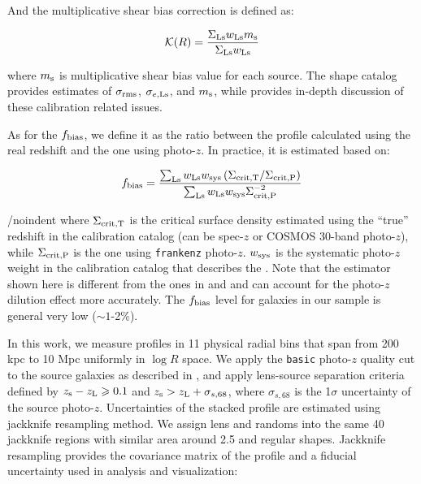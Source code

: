 \documentclass[fleqn,usenatbib,useAMS,english]{mnras}
\begin{document}
    \noindent And the multiplicative shear bias correction is defined as:

    \begin{equation}
        \mathcal{K}(R) = \frac{\Sigma_{\rm Ls} w_{\rm Ls} m_{\rm s}}{\Sigma_{\rm Ls} w_{\rm Ls}}
        \label{eq:kfactor}
    \end{equation}

    \noindent where $m_{\rm s}$ is multiplicative shear bias value for each source.
    The shape catalog provides estimates of $\sigma_{\rm rms}$, $\sigma_{e, \rm Ls}$, and $m_{\rm s}$,
    while \citet{HSC-WLCALIB} provides in-depth discussion of these calibration related
    issues.

    As for the $f_{\rm bias}$, we define it as the ratio between the \dsigma{} profile calculated using
    the real redshift and the one using photo-$z$.
    In practice, it is estimated based on:

    \begin{equation}
        f_{\rm bias} = \frac{\sum_{\rm Ls} w_{\rm Ls} w_{\rm sys}
            \left(\Sigma_{{\rm crit, T}} / \Sigma_{{\rm crit, P}} \right)}{
            \sum_{\rm Ls} w_{\rm Ls} w_{\rm sys} \Sigma^{-2}_{\rm crit, P}}
        \label{eq:fbias}
    \end{equation}

    /noindent where $\Sigma_{{\rm crit, T}}$ is the critical surface density estimated using the
    ``true'' redshift in the calibration catalog (can be spec-$z$ or COSMOS 30-band photo-$z$),
    while $\Sigma_{{\rm crit, P}}$ is the one using \texttt{frankenz} photo-$z$.
    $w_{\rm sys}$ is the systematic photo-$z$ weight in the calibration catalog that describes
    the .
    Note that the estimator shown here is different from the ones in \citet{Leauthaud2017} and
    \citet{Speagle2019} and can account for the photo-$z$ dilution effect more accurately.
    The $f_{\rm bias}$ level for galaxies in our sample is general very low ($\sim 1$-2\%).

    In this work, we measure \dsigma{} profiles in 11 physical radial bins that span from 200 kpc
    to 10 Mpc uniformly in $\log R$ space.
    We apply the \texttt{basic} photo-$z$ quality cut to the source galaxies as described in
    \citet{Speagle2019}, and apply lens-source separation criteria defined by
    $z_{\rm s} - z_{\rm L} \ge 0.1$ and
    $z_{\rm s} > z_{\rm L} + \sigma_{s,68}$, where $\sigma_{s,68}$ is the
    1$\sigma$ uncertainty of the source photo-$z$.
    Uncertainties of the stacked \dsigma{} profile are estimated using jackknife resampling method.
    We assign lens and randoms into the same 40 jackknife regions with similar area around
    2.5 \sqdeg{} and regular shapes.
    Jackknife resampling provides the covariance matrix of the \dsigma{} profile and a fiducial
    uncertainty used in analysis and visualization:
\end{document}
